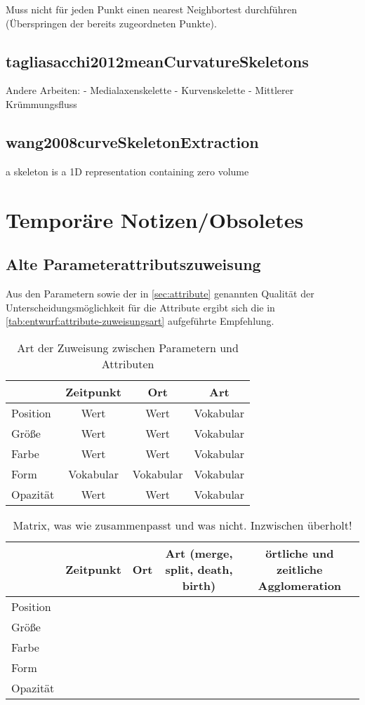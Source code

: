 Muss nicht für jeden Punkt einen nearest Neighbortest durchführen (Überspringen der bereits zugeordneten Punkte).

\section{tagliasacchi2012meanCurvatureSkeletons}

Andere Arbeiten:
- Medialaxenskelette
- Kurvenskelette
- Mittlerer Krümmungsfluss

\section{wang2008curveSkeletonExtraction}
\cite[S.~2]{wang2008curveSkeletonExtraction}
a skeleton is a 1D representation containing zero volume


\chapter{Temporäre Notizen/Obsoletes}

\section{Alte Parameterattributszuweisung}

Aus den Parametern sowie der in \autoref{sec:attribute} genannten Qualität der Unterscheidungsmöglichkeit für die Attribute ergibt sich die in \autoref{tab:entwurf:attribute-zuweisungsart} aufgeführte Empfehlung.

\begin{table} 
	\begin{tabularx}{\textwidth}{@{}LCCC@{}}
		\toprule
		& Zeitpunkt & Ort & Art \tabularnewline
		\midrule
		Position & Wert & Wert & Vokabular \tabularnewline
		Größe & Wert & Wert & Vokabular \tabularnewline 
		Farbe & Wert & Wert & Vokabular \tabularnewline 
		Form & Vokabular & Vokabular & Vokabular \tabularnewline 
		Opazität & Wert & Wert & Vokabular \tabularnewline 
		\bottomrule
	\end{tabularx}
	\caption{Art der Zuweisung zwischen Parametern und Attributen}\label{tab:entwurf:attribute-zuweisungsart}
\end{table}


\begin{table}
	\begin{tabular}{l|ccc|c}
		& Zeitpunkt & Ort & Art (merge, split, death, birth) & örtliche und zeitliche Agglomeration \\
		\hline
		Position & \checkmark & \checkmark & \checkmark & \checkmark \\
		Größe & \checkmark & \kreuz & \checkmark & \checkmark \\
		Farbe & \checkmark & \kreuz & \checkmark & \checkmark \\
		Form & \kreuz & \kreuz & \checkmark & \checkmark \\
		Opazität & \checkmark & \kreuz & \checkmark & \checkmark \\
	\end{tabular}
	\caption{Matrix, was wie zusammenpasst und was nicht. Inzwischen überholt!}
\end{table}

